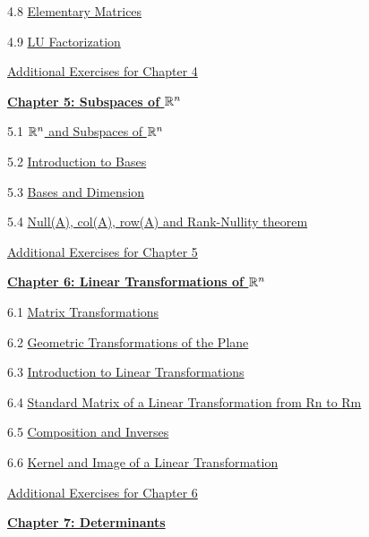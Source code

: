 \documentclass{ximera}
\begin{document}
4.8	\href{https://ximera.osu.edu/oerlinalg/LinearAlgebra/MAT-0060/main}{Elementary Matrices}
	
4.9	\href{https://ximera.osu.edu/oerlinalg/LinearAlgebra/MAT-0070/main}{LU Factorization}
	
\href{https://ximera.osu.edu/oerlinalg/LinearAlgebra/SUPX-0040/main}{Additional Exercises for Chapter 4}
	
\href{https://ximera.osu.edu/oerlinalg/LinearAlgebra/XLAChapter_subspacesRn/main}{\textbf{Chapter 5: Subspaces of $\mathbb{R}^n$}}
	
5.1	\href{https://ximera.osu.edu/oerlinalg/LinearAlgebra/VSP-0020/main}{$\mathbb{R}^n$ and Subspaces of $\mathbb{R}^n$}
	
5.2	\href{https://ximera.osu.edu/oerlinalg/LinearAlgebra/VSP-0030/main}{Introduction to Bases}
	
5.3	\href{https://ximera.osu.edu/oerlinalg/LinearAlgebra/VSP-0035/main}{Bases and Dimension}
	
5.4	\href{https://ximera.osu.edu/oerlinalg/LinearAlgebra/VSP-0040/main}{Null(A), col(A), row(A) and Rank-Nullity theorem}
	
\href{https://ximera.osu.edu/oerlinalg/LinearAlgebra/SUPX-0050/main}{Additional Exercises for Chapter 5}
	
\href{https://ximera.osu.edu/oerlinalg/LinearAlgebra/XLAChapter_linTrans/main}{\textbf{Chapter 6: Linear Transformations of $\mathbb{R}^n$}}
	
6.1	\href{https://ximera.osu.edu/oerlinalg/LinearAlgebra/LTR-0005/main}{Matrix Transformations}
	
6.2	\href{https://ximera.osu.edu/oerlinalg/LinearAlgebra/LTR-0070/main}{Geometric Transformations of the Plane}
	
6.3	\href{https://ximera.osu.edu/oerlinalg/LinearAlgebra/LTR-0010/main}{Introduction to Linear Transformations}
	
6.4	\href{https://ximera.osu.edu/oerlinalg/LinearAlgebra/LTR-0020/main}{Standard Matrix of a Linear Transformation from Rn to Rm}
	
6.5	\href{https://ximera.osu.edu/oerlinalg/LinearAlgebra/LTR-0030/main}{Composition and Inverses}
	
6.6	\href{https://ximera.osu.edu/oerlinalg/LinearAlgebra/LTR-0050/main}{Kernel and Image of a Linear Transformation}
	
\href{https://ximera.osu.edu/oerlinalg/LinearAlgebra/SUPX-0060/main}{Additional Exercises for Chapter 6}
	
\href{https://ximera.osu.edu/oerlinalg/LinearAlgebra/XLAChapter_det/main}{\textbf{Chapter 7: Determinants}}
	
\end{document}
